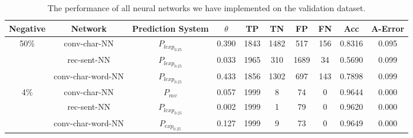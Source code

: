 \begin{table}[h]
    \begin{adjustbox}{center}
    \begin{tabular}{|c|c|c|c|c|c|c|c|c|c|}
        \hline
        Negative               & Network                 & Prediction System &
        $\theta$               & TP                      & TN                &
        FP                     & FN                      & Acc               &
        A-Error
        \\ \hline
        \multirow{3}{*}{50\%}  & \gls{conv-char-NN}      & $P_{lexp_{0.25}}$ &
        0.390                  & 1843                    & 1482              &
        517                    & 156                     & 0.8316            &
        0.095
        \\
        \cline{2-10}           & \gls{rec-sent-NN}       & $P_{lexp_{0.25}}$ &
        0.033                  & 1965                    & 310               &
        1689                   & 34                      & 0.5690            &
        0.099
        \\
        \cline{2-10}           & \gls{conv-char-word-NN} & $P_{lexp_{0.25}}$ &
        0.433                  & 1856                    & 1302              &
        697                    & 143                     & 0.7898            &
        0.099
        \\ \hline
        \multirow{3}{*}{4\%}   & \gls{conv-char-NN}      & $P_{mv}$          &
        0.057                  & 1999                    & 8                 &
        74                     & 0                       & 0.9644            &
        0.000
        \\
        \cline{2-10}           & \gls{rec-sent-NN}       & $P_{lexp_{0.25}}$ &
        0.002                  & 1999                    & 1                 &
        79                     & 0                       & 0.9620            &
        0.000
        \\
        \cline{2-10}           & \gls{conv-char-word-NN} & $P_{exp_{0.25}}$  &
        0.127                  & 1999                    & 9                 &
        73                     & 0                       & 0.9649            &
        0.000
        \\ \hline
    \end{tabular}
    \end{adjustbox}
    \caption{The performance of all neural networks we have implemented on the
        validation dataset.}
    \label{tab:experiment-validation-results}
\end{table}
